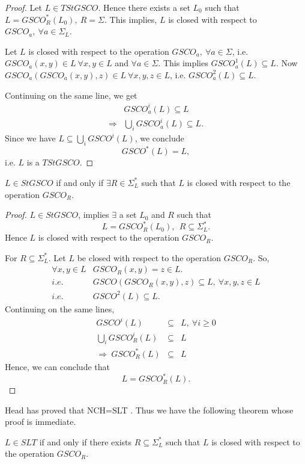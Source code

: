 \documentclass{llncs}
\newcommand{\sg}{\Sigma}
\begin{document}
\begin{proof}
Let $L\in TStGSCO$. Hence there exists a set $L_0$ such that
$L=GSCO_R^*(L_0), ~R=\sg$. This implies, $L$ is closed with respect
to $GSCO_a, ~\forall a\in\sg_L$.
\par  Let $L$ is  closed with respect to the operation $GSCO_a, ~\forall
a\in\sg$, i.e. $GSCO_a(x,y)\in L~\forall x,y\in L$ and $\forall a\in
\sg$. This implies $GSCO_a^1(L)\subseteq L$. Now
$GSCO_a(GSCO_a(x,y),z)\in L~\forall x,y,z \in L$, i.e.
$GSCO_a^2(L)\subseteq L$.
\par Continuing on the same line, we get
\begin{eqnarray*}
 & GSCO_a^i(L)\subseteq L\\
 \Rightarrow & \bigcup_iGSCO_a^i(L)\subseteq L.
\end{eqnarray*}
Since we have $L\subseteq \bigcup_iGSCO^i(L)$,  we conclude
\[GSCO^*(L)=L,\]
i.e. $L$ is a $TStGSCO$.
\end{proof}
\begin{theorem}

$L\in StGSCO$ if and only if $\exists R\in \sg_L^*$ such that $L$ is
closed with respect to the operation $GSCO_R$.
\end{theorem}

\begin{proof}
$L\in StGSCO$, implies $\exists$ a set $L_0$ and $R$ such that
\[L=GSCO_R^*(L_0),~~R\subseteq \sg_L^*.\]
Hence $L$ is closed with respect to the operation $GSCO_R$.
\par For  $R\subseteq \sg_L^*$. Let  $L$
be closed with respect to the operation $GSCO_R$. So,
 \begin{eqnarray*}
  \forall x,y\in
L&GSCO_R(x,y)=z\in L.\\
  i.e. & GSCO(GSCO_R(x,y),z)\subseteq L, ~\forall x,y,z\in L\\
i.e. & GSCO^2(L)\subseteq L.
\end{eqnarray*}
Continuing on the same lines,
\begin{eqnarray*}
GSCO^i(L)&\subseteq& L,~\forall i\geq 0\\
\bigcup_i GSCO_R^i(L)&\subseteq& L\\
\Rightarrow ~GSCO_R^*(L)&\subseteq& L
\end{eqnarray*}
Hence, we can conclude that
\[L=GSCO_R^*(L).\]
\end{proof}
\par Head has proved that NCH=SLT \cite{head1}. Thus we have the
following theorem whose proof is immediate.
\begin{theorem}
$L\in SLT$ if and only if there exists $R\subseteq\sg_L^*$ such that
$L$ is closed with respect to the operation $GSCO_R$.
\end{theorem}
\end{document}
